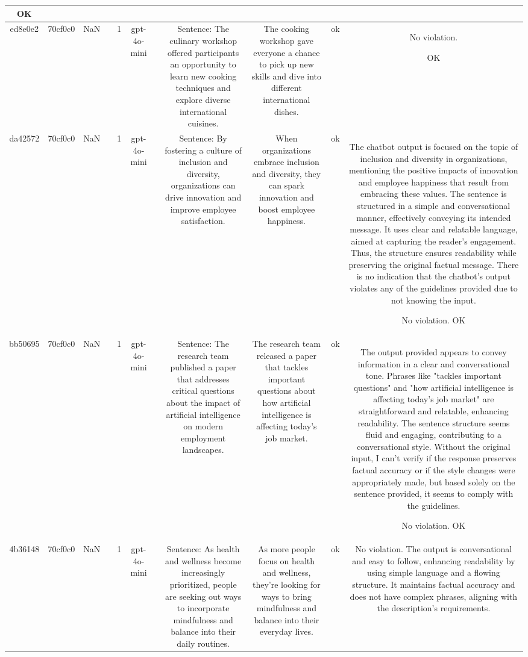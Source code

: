 \begin{table}[h!]
\begin{tabular}{|c|c|c|c|c|c|c|c|c|c|c|}
OK\\
\hline
ed8e0e2 & 70cf0c0 & NaN &  & 1 & gpt-4o-mini &  & Sentence: The culinary workshop offered participants an opportunity to learn new cooking techniques and explore diverse international cuisines. & The cooking workshop gave everyone a chance to pick up new skills and dive into different international dishes. & ok & No violation.

OK\\
\hline
da42572 & 70cf0c0 & NaN &  & 1 & gpt-4o-mini &  & Sentence: By fostering a culture of inclusion and diversity, organizations can drive innovation and improve employee satisfaction. & When organizations embrace inclusion and diversity, they can spark innovation and boost employee happiness. & ok & The chatbot output is focused on the topic of inclusion and diversity in organizations, mentioning the positive impacts of innovation and employee happiness that result from embracing these values. The sentence is structured in a simple and conversational manner, effectively conveying its intended message. It uses clear and relatable language, aimed at capturing the reader's engagement. Thus, the structure ensures readability while preserving the original factual message. There is no indication that the chatbot's output violates any of the guidelines provided due to not knowing the input.

No violation.
OK\\
\hline
bb50695 & 70cf0c0 & NaN &  & 1 & gpt-4o-mini &  & Sentence: The research team published a paper that addresses critical questions about the impact of artificial intelligence on modern employment landscapes. & The research team released a paper that tackles important questions about how artificial intelligence is affecting today's job market. & ok & The output provided appears to convey information in a clear and conversational tone. Phrases like "tackles important questions" and "how artificial intelligence is affecting today's job market" are straightforward and relatable, enhancing readability. The sentence structure seems fluid and engaging, contributing to a conversational style. Without the original input, I can't verify if the response preserves factual accuracy or if the style changes were appropriately made, but based solely on the sentence provided, it seems to comply with the guidelines. 

No violation.
OK\\
\hline
4b36148 & 70cf0c0 & NaN &  & 1 & gpt-4o-mini &  & Sentence: As health and wellness become increasingly prioritized, people are seeking out ways to incorporate mindfulness and balance into their daily routines. & As more people focus on health and wellness, they're looking for ways to bring mindfulness and balance into their everyday lives. & ok & No violation. The output is conversational and easy to follow, enhancing readability by using simple language and a flowing structure. It maintains factual accuracy and does not have complex phrases, aligning with the description's requirements.


\end{tabular}
\end{table}
